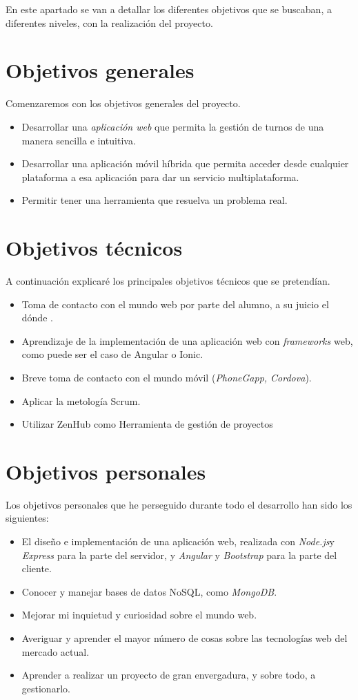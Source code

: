 
En este apartado se van a detallar los diferentes objetivos que se buscaban, a diferentes niveles, con la realización del proyecto.

\section{Objetivos generales}\label{objetivos-generales}
Comenzaremos con los objetivos generales del proyecto. 
\begin{itemize}
\tightlist
\item
  Desarrollar una  \emph{aplicación web} que permita la gestión de turnos de una manera sencilla e intuitiva. 
\item
  Desarrollar una aplicación móvil híbrida que permita acceder desde cualquier plataforma a esa aplicación para dar un servicio multiplataforma. 
\item
  Permitir tener una herramienta que resuelva un problema real.
\end{itemize}

\section{Objetivos técnicos}\label{objetivos-tecnicos}
A continuación explicaré los principales objetivos técnicos que se pretendían. 
\begin{itemize}
\tightlist
\item
  Toma de contacto con el mundo web por parte del alumno, a su juicio el dónde . 
 \item
  Aprendizaje de la implementación de una aplicación web con  \emph{frameworks} web, como puede ser el caso de Angular o Ionic. 
\item
  Breve toma de contacto con el mundo móvil (\emph{PhoneGapp, Cordova}).
\item
 Aplicar la metología Scrum.
 \item
 Utilizar ZenHub como Herramienta de gestión de proyectos
\end{itemize}

\section{Objetivos personales}\label{objetivos-personales}
Los objetivos personales que he perseguido durante todo el desarrollo han sido los siguientes:
\begin{itemize}
\tightlist
\item
 El diseño e implementación de una aplicación web, realizada con \emph{Node.js}y \emph{Express} para la parte del
servidor, y \emph{Angular} y \emph{Bootstrap} para la parte del cliente. 
\item
  Conocer y manejar bases de datos NoSQL, como \emph{MongoDB}.
\item
  Mejorar mi inquietud y curiosidad sobre el mundo web. 
\item
  Averiguar y aprender el mayor número de cosas sobre las tecnologías web del mercado actual. 
\item
  Aprender a realizar un proyecto de gran envergadura, y sobre todo, a gestionarlo.
\end{itemize}

